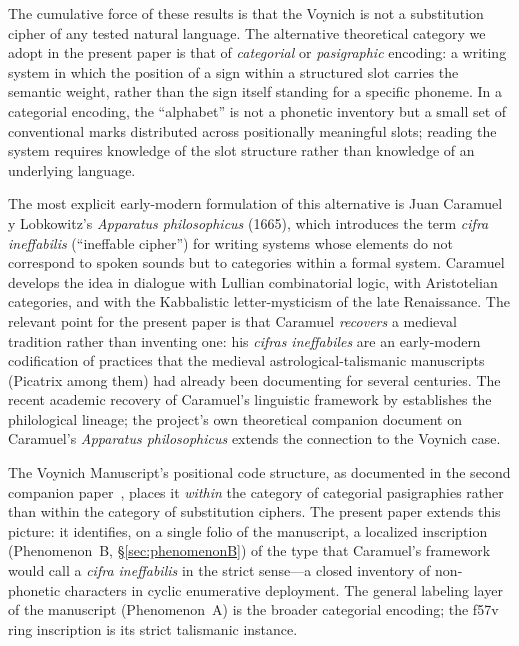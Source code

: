 The cumulative force of these results is that the Voynich is not a
substitution cipher of any tested natural language. The alternative
theoretical category we adopt in the present paper is that of
\emph{categorial} or \emph{pasigraphic} encoding: a writing system in
which the position of a sign within a structured slot carries the
semantic weight, rather than the sign itself standing for a specific
phoneme. In a categorial encoding, the ``alphabet'' is not a phonetic
inventory but a small set of conventional marks distributed across
positionally meaningful slots; reading the system requires knowledge
of the slot structure rather than knowledge of an underlying language.

The most explicit early-modern formulation of this alternative is
Juan Caramuel y Lobkowitz's \textit{Apparatus philosophicus} (1665),
which introduces the term \textit{cifra ineffabilis} (``ineffable
cipher'') for writing systems whose elements do not correspond to
spoken sounds but to categories within a formal system. Caramuel
develops the idea in dialogue with Lullian combinatorial logic, with
Aristotelian categories, and with the Kabbalistic letter-mysticism of
the late Renaissance. The relevant point for the present paper is
that Caramuel \emph{recovers} a medieval tradition rather than
inventing one: his \textit{cifras ineffabiles} are an early-modern
codification of practices that the medieval astrological-talismanic
manuscripts (Picatrix among them) had already been documenting for
several centuries. The recent academic recovery of Caramuel's
linguistic framework by \citet{martinezgavilan2025} establishes the
philological lineage; the project's own theoretical companion document
on Caramuel's \textit{Apparatus philosophicus} extends the connection
to the Voynich case.

The Voynich Manuscript's positional code structure, as documented in
the second companion paper~\citep{jimenez2026twotier}, places it
\emph{within} the category of categorial pasigraphies rather than
within the category of substitution ciphers. The present paper extends
this picture: it identifies, on a single folio of the manuscript,
a localized inscription (Phenomenon~B, \S\ref{sec:phenomenonB}) of
the type that Caramuel's framework would call a \textit{cifra
ineffabilis} in the strict sense---a closed inventory of
non-phonetic characters in cyclic enumerative deployment. The general
labeling layer of the manuscript (Phenomenon~A) is the broader
categorial encoding; the f57v ring inscription is its strict
talismanic instance.

